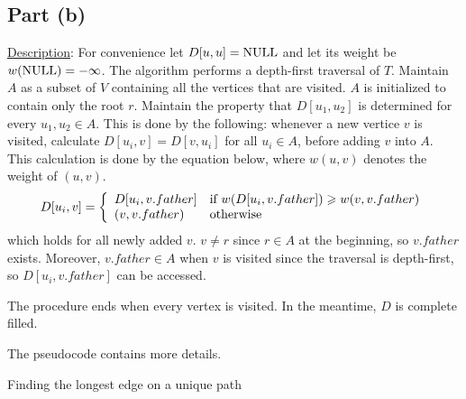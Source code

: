 \documentclass{article}
\begin{document}
\subsection{Part (b)}
\noindent\underline{Description}: For convenience let $D[u,u]=\textup{NULL}$ and let its weight be $w(\textup{NULL})=-\infty$. The algorithm performs a depth-first traversal of $T$. Maintain $A$ as a subset of $V$ containing all the vertices that are visited. $A$ is initialized to contain only the root $r$. Maintain the property that $D[u_1,u_2]$ is determined for every $u_1,u_2\in A$. This is done by the following: whenever a new vertice $v$ is visited, calculate $D[u_i,v]=D[v,u_i]$ for all $u_i\in A$, before adding $v$ into $A$. This calculation is done by the equation below, where $w(u,v)$ denotes the weight of $(u,v)$.
\begin{equation*}
D[u_i,v]=\left\{\begin{array}{ll}D[u_i,v.father]&\textup{if }w(D[u_i,v.father])\geqslant w(v,v.father)\\(v,v.father)&\textup{otherwise}\end{array}\right.
\end{equation*}
which holds for all newly added $v$. $v\neq r$ since $r\in A$ at the beginning, so $v.father$ exists. Moreover, $v.father\in A$ when $v$ is visited since the traversal is depth-first, so $D[u_i,v.father]$ can be accessed.

The procedure ends when every vertex is visited. In the meantime, $D$ is complete filled.

The pseudocode contains more details.
\begin{algorithm}
\caption{Finding the longest edge on a unique path}
\begin{algorithmic}[1]
\EndProcedure

	\Return{}
\Else{}
			\Else{}
			\EndIf
		\EndFor
	\EndFor
	\State\Return{}
\EndIf
\EndProcedure
\end{algorithmic}
\end{algorithm}
\end{document}
